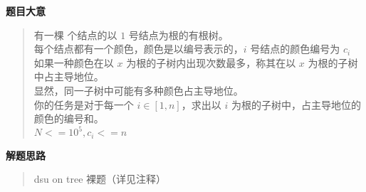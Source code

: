 \documentclass[E:/GsjzTle/main/main.tex]{subfiles}
\begin{document}
\textbf{题目大意}

\begin{quote}
有一棵 个结点的以 \(1\) 号结点为根的有根树。\\
每个结点都有一个颜色，颜色是以编号表示的，\(i\) 号结点的颜色编号为
\(c_i\) \\
如果一种颜色在以 \(x\) 为根的子树内出现次数最多，称其在以 \(x\)
为根的子树中占主导地位。\\
显然，同一子树中可能有多种颜色占主导地位。\\
你的任务是对于每一个 \(i∈[1,n]\)，求出以 \(i\)
为根的子树中，占主导地位的颜色的编号和。\\
\(N <= 10^5 , c_i <= n\)
\end{quote}

\textbf{解题思路}

\begin{quote}
dsu on tree 裸题（详见注释）
\end{quote}
\end{document}
